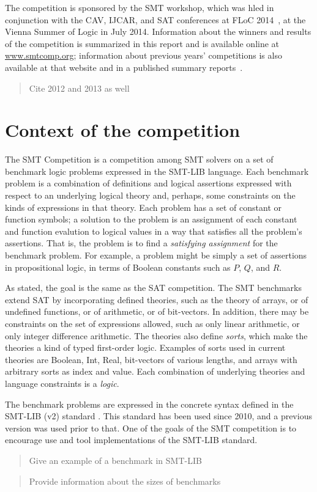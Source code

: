 \documentclass[twosize,11pt]{article}
\newcommand{\tjark}[1]{\begin{quote}\sc #1\marginpar{\textcolor{red}{$\ast^{\mbox{TW}}$}}\end{quote}}
\begin{document}
The competition is sponsored by the SMT workshop, which was hled in conjunction with the
CAV, IJCAR, and SAT conferences at FLoC 2014~\cite{FLoC2014}, at the Vienna Summer of Logic\cite{VSL} in July 2014.
Information about the winners
and results of the competition is summarized in this report and is available online at \url{www.smtcomp.org}; information
about previous years' competitions is also available at that website and in a published summary reports~\cite{springerlink:10.1007/s10817-012-9246-5}.\tjark{Cite 2012 and 2013 as well}

\section{Context of the competition}
\label{sec:context}

The SMT Competition is a competition among SMT solvers on a set of benchmark logic problems expressed in the SMT-LIB \cite{TBD} language. Each benchmark problem is a combination of definitions and logical assertions expressed with respect to an underlying logical theory and, perhaps, some constraints on the kinds of expressions in that theory. Each problem has a set of constant or function symbols; a solution to the problem is an assignment of each constant and function evalution to logical values in a way that satisfies all the problem's assertions. That is, the problem is to find a \textit{satisfying assignment} for the benchmark problem. For example, a problem might be simply a set of assertions in 
propositional logic, in terms of Boolean constants such as $P$, $Q$, and $R$.

As stated, the goal is the same as the SAT competition. The SMT benchmarks extend SAT by incorporating defined theories, such as the theory of arrays, or of undefined functions, or of arithmetic, or of bit-vectors. In addition, there may be constraints on the set of expressions allowed, such as only linear arithmetic, or only integer difference arithmetic. The theories also define \textit{sorts}, which make the theories a kind of typed first-order logic. Examples of sorts used in current theories are Boolean, Int, Real, bit-vectors of various lengths, and arrays with arbitrary sorts as index and value. Each combination of underlying theories and language constraints is a \textit{logic}.

The benchmark problems are expressed in the concrete syntax defined in the SMT-LIB (v2) standard \cite{TBD}. This standard has been used since 2010, and a previous version was used prior to that. One of the goals of the SMT competition is to encourage use and tool implementations of the SMT-LIB standard.
\tjark{Give an example of a benchmark in SMT-LIB} \tjark{Provide information about the sizes of benchmarks}
\end{document}
